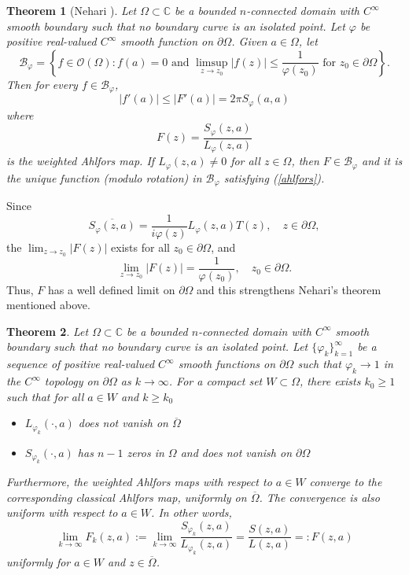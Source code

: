 \documentclass[11pt, reqno]{amsart}
\newtheorem{thm}{Theorem}[section]
\numberwithin{equation}{section}
\newcommand{\pa}{\partial}
\newcommand{\ov}{\overline}
\newcommand{\Om}{\Omega}
\begin{document}
	\begin{thm}[Nehari \cite{Nehari}]
		Let $\Omega\subset\mathbb{C}$ be a bounded $n$-connected domain with $C^{\infty}$ smooth boundary such that no boundary curve is an isolated point. Let $\varphi$ be positive real-valued $C^{\infty}$ smooth function on $\partial\Om$. Given $a\in\Om$, let
		\[
		\mathcal{B}_{\varphi} = \left\lbrace
		f\in\mathcal{O}(\Om) : f(a) = 0 \text{ and } \limsup_{z\rightarrow z_0}\vert f(z)\vert \leq \frac{1}{\varphi(z_0)}\text{ for }z_0\in\partial\Om\right\rbrace.
		\]
		Then for every $f\in \mathcal{B}_{\varphi}$,
		\begin{equation}\label{ahlfors}
			\vert f'(a)\vert \leq \vert F'(a) \vert = 2\pi S_{\varphi}(a,a)
		\end{equation}
		where 
		\begin{equation}
		F(z) = \frac{S_{\varphi}(z,a)}{L_{\varphi}(z,a)}
		\end{equation}
		is the weighted Ahlfors map. If $L_{\varphi}(z,a) \neq 0$ for all $z\in \Om$, then $F\in \mathcal{B}_{\varphi}$ and it is the unique function (modulo rotation) in $\mathcal{B}_{\varphi}$ satisfying (\ref{ahlfors}).
	\end{thm}
	

		Since 
		\[
		\overline{S_{\varphi}(z,a)} = \frac{1}{i\varphi(z)} L_{\varphi}(z,a) T(z), \quad z\in\partial\Om,
		\]
		the $\lim_{z\rightarrow z_0}\vert F(z)\vert$ exists for all $z_0\in\partial\Om$, and
		\begin{equation}
		\lim_{z\rightarrow z_0} \vert F(z)\vert 
		=
		\frac{1}{\varphi(z_0)},\quad z_0\in\partial\Om.
		\end{equation}
	Thus, $F$ has a well defined limit on $\pa \Omega$ and this strengthens Nehari's theorem mentioned above.
	
	\begin{thm}
		Let $\Omega\subset\mathbb{C}$ be a bounded $n$-connected domain with $C^{\infty}$ smooth boundary such that no boundary curve is an isolated point. Let $\{\varphi_k\}_{k=1}^{\infty}$ be a sequence of positive real-valued $C^{\infty}$ smooth functions on $\partial\Omega$ such that $\varphi_k\rightarrow 1$ in the $C^{\infty}$ topology on $\partial\Omega$ as $k\rightarrow\infty$. For a compact set $W\subset\Omega$, there exists $k_0 \ge 1$ such that for all $a\in W$ and $k\geq k_0$
		\begin{itemize}
			\item[(i)] $L_{\varphi_k}(\cdot,a)$ does not vanish on $\overline{\Om}$ 
			\item[(ii)] $S_{\varphi_k}(\cdot,a)$ has $n-1$ zeros in $\Om$ and does not vanish on $\partial\Om$ 
		\end{itemize}
		Furthermore, the weighted Ahlfors maps with respect to $a\in W$ converge to the corresponding classical Ahlfors map, uniformly on $\ov{\Om}$. The convergence is also uniform with respect to $a\in W$. In other words,
		\begin{equation}
		\lim_{k\rightarrow\infty} F_k(z,a)
		:=
		\lim_{k\rightarrow\infty} \frac{S_{\varphi_k}(z,a)}{L_{\varphi_k}(z,a)} 
		=
		\frac{S(z,a)}{L(z,a)} 
		=:
		F(z,a)
		\end{equation}
		uniformly for $a\in W$ and $z\in\overline{\Om}$.
	\end{thm}
	
\end{document}
